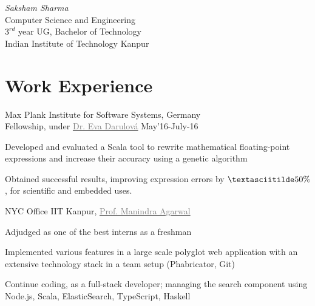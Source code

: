 \documentclass{tccv}
\begin{document}
{ \textit{Saksham \textcolor{myred}{Sharma}}}
\medskip\\
\large{Computer Science and Engineering}\\
\large{$3^{rd}$ year UG, Bachelor of Technology}\\
{Indian Institute of Technology Kanpur}

\vspace{-0.5cm}
\section{Work Experience}
\vspace{-0.1cm}
\begin{experience}

  {Max Plank Institute for Software Systems, \small{Germany}\\
  Fellowship, under
  \href{http://www.mpi-sws.org/~eva}{\textcolor{gray}{Dr. Eva
      Darulová}}
  \hfill May'16-July-16}
  {
  \item Developed and evaluated a Scala tool to rewrite
    mathematical floating-point expressions and increase their
    accuracy using a genetic algorithm
  \item Obtained successful results, improving expression errors by
    $\textasciitilde50\%$, for scientific and embedded uses.
  }

  {NYC Office IIT Kanpur,
    \href{http://cse.iitk.ac.in/~manindra}{\textcolor{gray}{Prof. Manindra Agarwal}}}
  {
  \item Adjudged as one of the best interns as a freshman
  \item Implemented various features in a large scale polyglot web
    application with an extensive technology stack in a team setup
    (Phabricator, Git)
  \item Continue coding, as a full-stack developer;
    managing the search component using Node.js, Scala, ElasticSearch,
    TypeScript, Haskell
  }
\end{experience}

\vspace{-0.5cm}
\end{document}
